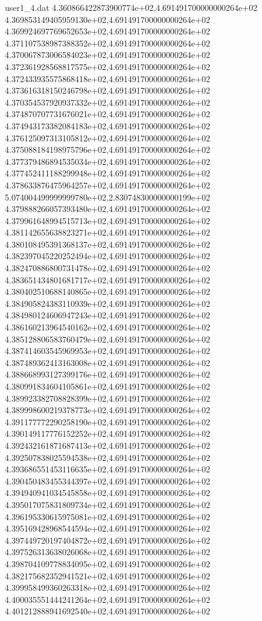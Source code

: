 \begin{filecontents}{user1_4.dat}
4.360866422873900774e+02,4.691491700000000264e+02
4.369853149405959130e+02,4.691491700000000264e+02
4.369924697769652653e+02,4.691491700000000264e+02
4.371107538987388352e+02,4.691491700000000264e+02
4.370067873006584023e+02,4.691491700000000264e+02
4.372361928568817575e+02,4.691491700000000264e+02
4.372433935575868418e+02,4.691491700000000264e+02
4.373616318150246798e+02,4.691491700000000264e+02
4.370354537920937332e+02,4.691491700000000264e+02
4.374870707731676021e+02,4.691491700000000264e+02
4.374943173382084183e+02,4.691491700000000264e+02
4.376125097313105812e+02,4.691491700000000264e+02
4.375088184198975796e+02,4.691491700000000264e+02
4.377379486894535034e+02,4.691491700000000264e+02
4.377452411188299948e+02,4.691491700000000264e+02
4.378633876475964257e+02,4.691491700000000264e+02
5.074004499999999780e+02,2.830748300000000199e+02
4.379888266057393480e+02,4.691491700000000264e+02
4.379961648994515713e+02,4.691491700000000264e+02
4.381142655638823271e+02,4.691491700000000264e+02
4.380108495391368137e+02,4.691491700000000264e+02
4.382397045220252494e+02,4.691491700000000264e+02
4.382470886800731478e+02,4.691491700000000264e+02
4.383651434801681717e+02,4.691491700000000264e+02
4.380402510688140865e+02,4.691491700000000264e+02
4.384905824383110939e+02,4.691491700000000264e+02
4.384980124606947243e+02,4.691491700000000264e+02
4.386160213964540162e+02,4.691491700000000264e+02
4.385128806583760479e+02,4.691491700000000264e+02
4.387414603545969953e+02,4.691491700000000264e+02
4.387489362413163008e+02,4.691491700000000264e+02
4.388668993127399176e+02,4.691491700000000264e+02
4.380991834604105861e+02,4.691491700000000264e+02
4.389923382708828399e+02,4.691491700000000264e+02
4.389998600219378773e+02,4.691491700000000264e+02
4.391177772290258190e+02,4.691491700000000264e+02
4.390149117776152252e+02,4.691491700000000264e+02
4.392432161871687413e+02,4.691491700000000264e+02
4.392507838025594538e+02,4.691491700000000264e+02
4.393686551453116635e+02,4.691491700000000264e+02
4.390450483455344397e+02,4.691491700000000264e+02
4.394940941034545858e+02,4.691491700000000264e+02
4.395017075831809734e+02,4.691491700000000264e+02
4.396195330615975081e+02,4.691491700000000264e+02
4.395169428968544594e+02,4.691491700000000264e+02
4.397449720197404872e+02,4.691491700000000264e+02
4.397526313638026068e+02,4.691491700000000264e+02
4.398704109778834095e+02,4.691491700000000264e+02
4.382175682352941521e+02,4.691491700000000264e+02
4.399958499360263318e+02,4.691491700000000264e+02
4.400035551444241264e+02,4.691491700000000264e+02
4.401212888941692540e+02,4.691491700000000264e+02

\end{filecontents}
